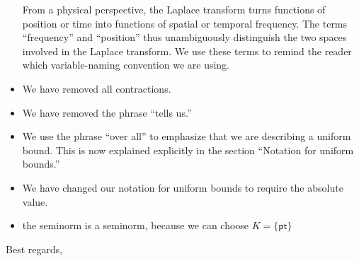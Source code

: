 \documentclass{letter}
\begin{document}
\begin{letter}{}
\begin{itemize}
From a physical perspective, the Laplace transform turns functions of position or time into functions of spatial or temporal frequency. The terms ``frequency'' and ``position'' thus unambiguously distinguish the two spaces involved in the Laplace transform. We use these terms to remind the reader which variable-naming convention we are using.
\item We have removed all contractions.
\item We have removed the phrase ``tells us.''
\item We use the phrase ``over all'' to emphasize that we are describing a uniform bound. This is now explained explicitly in the section ``Notation for uniform bounds.''
\item We have changed our notation for uniform bounds to require the absolute value.
\item the seminorm is a seminorm, because we can choose $K=\{\mathsf{pt}\}$
\end{itemize}
\color{black}
\closing{Best regards,}
\end{letter}
\end{document}
